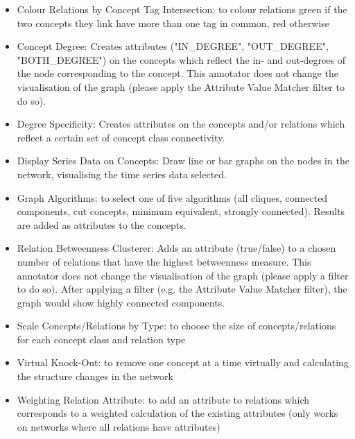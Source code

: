 \begin{itemize}
\begin{itemize}
      \item Colour Relations by Concept Tag Intersection:
      to colour relations green if the two concepts they link have more than one tag in common, red otherwise
      \item Concept Degree:
      Creates attributes ("IN\_DEGREE", "OUT\_DEGREE", "BOTH\_DEGREE") on the concepts which reflect the in- and out-degrees of the node corresponding to the concept. 
      This annotator does not change the visualisation of the graph (please apply the Attribute Value Matcher filter to do so).
      \item Degree Specificity:
      Creates attributes on the concepts and/or relations which reflect a certain set of concept class connectivity.
      \item Display Series Data on Concepts:
      Draw line or bar graphs on the nodes in the network, visualising the time series data selected.
      \item Graph Algorithms:
      to select one of five algorithms (all cliques, connected components, cut
      concepts, minimum equivalent, strongly connected). 
      Results are added as attributes to the concepts.
      \item Relation Betweenness Clusterer:
      Adds an attribute (true/false) to a chosen number of relations that have the highest betweenness measure. 
      This annotator does not change the visualisation of the graph (please apply a filter to do so). 
      After applying a filter (e.g. the Attribute Value Matcher filter), the graph would show highly connected components.
      \item Scale Concepts/Relations by Type:
      to choose the size of concepts/relations for each concept class and relation type
      \item Virtual Knock-Out:
      to remove one concept at a time virtually and calculating the structure changes in the network
      \item Weighting Relation Attribute:
      to add an attribute to relations which corresponds to a weighted calculation of the existing attributes (only works on networks where all relations have attributes)
      \end{itemize}
   \end{itemize}


